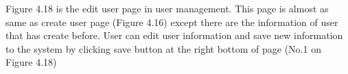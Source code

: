 \documentclass[12pt,oneside,openright,a4paper]{cpe-english-project}
\begin{document}
Figure 4.18 is the edit user page in user management. This page is almost as same as 
create user page (Figure 4.16) except there are the information of user that has create before. 
User can edit user information and save new information to the system by clicking save 
button at the right bottom of page (No.1 on Figure 4.18)

\end{document}
